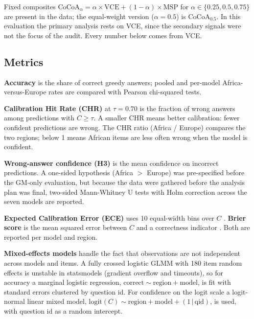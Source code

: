 \documentclass[11pt]{article}
\begin{document}
Fixed composites $\text{CoCoA}_\alpha = \alpha \times \text{VCE} + (1-\alpha) \times \text{MSP}$ for $\alpha \in \{0.25, 0.5, 0.75\}$ are present in the data; the equal-weight version ($\alpha = 0.5$) is CoCoA$_{0.5}$. In this evaluation the primary analysis rests on VCE, since the secondary signals were not the focus of the audit. Every number below comes from VCE.

\subsection{Metrics}

\textbf{Accuracy} is the share of correct greedy answers; pooled and per-model Africa-versus-Europe rates are compared with Pearson chi-squared tests.

\textbf{Calibration Hit Rate (CHR)} at $\tau = 0.70$ is the fraction of wrong answers among predictions with $C \geq \tau$. A smaller CHR means better calibration: fewer confident predictions are wrong. The CHR ratio (Africa / Europe) compares the two regions; below 1 means African items are less often wrong when the model is confident.

\textbf{Wrong-answer confidence (H3)} is the mean confidence on incorrect predictions. A one-sided hypothesis (Africa $>$ Europe) was pre-specified before the GM-only evaluation, but because the data were gathered before the analysis plan was final, two-sided Mann-Whitney U tests with Holm correction across the seven models are reported.

\textbf{Expected Calibration Error (ECE)} uses 10 equal-width bins over $C$ \cite{guo2017calibration}. \textbf{Brier score} is the mean squared error between $C$ and a correctness indicator \cite{niculescu2005predicting}. Both are reported per model and region.

\textbf{Mixed-effects models} handle the fact that observations are not independent across models and items. A fully crossed logistic GLMM with 180 item random effects is unstable in statsmodels (gradient overflow and timeouts), so for accuracy a marginal logistic regression, $\text{correct} \sim \text{region} + \text{model}$, is fit with standard errors clustered by question id. For confidence on the logit scale a logit-normal linear mixed model, $\text{logit}(C) \sim \text{region} + \text{model} + (1 \,|\, \text{qid})$, is used, with question id as a random intercept.
\end{document}
